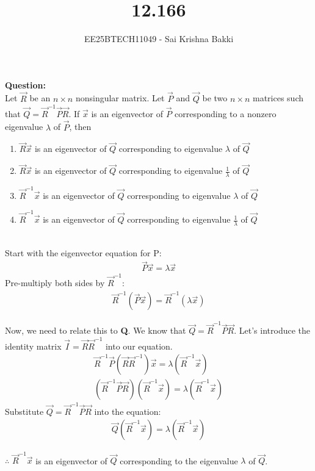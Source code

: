\documentclass[journal]{IEEEtran}
\begin{document}

\vspace{3cm}

\title{12.166}
\author{EE25BTECH11049 - Sai Krishna Bakki}
\maketitle
\vspace{-3em}
\textbf{Question:}\\
Let $\vec{R}$ be an $n \times n$ nonsingular matrix. Let $\vec{P}$ and $\vec{Q}$ be two $n \times n$ matrices such that $\vec{Q} = \vec{R}^{-1}\vec{P}\vec{R}$. If $\vec{x}$ is an eigenvector of $\vec{P}$ corresponding to a nonzero eigenvalue $\lambda$ of $\vec{P}$, then
\begin{enumerate}[label=\alph*)]
    \item $\vec{R}\vec{x}$ is an eigenvector of $\vec{Q}$ corresponding to eigenvalue $\lambda$ of $\vec{Q}$
    \item $\vec{R}\vec{x}$ is an eigenvector of $\vec{Q}$ corresponding to eigenvalue $\frac{1}{\lambda}$ of $\vec{Q}$
    \item $\vec{R}^{-1}\vec{x}$ is an eigenvector of $\vec{Q}$ corresponding to eigenvalue $\lambda$ of $\vec{Q}$
    \item $\vec{R}^{-1}\vec{x}$ is an eigenvector of $\vec{Q}$ corresponding to eigenvalue $\frac{1}{\lambda}$ of $\vec{Q}$
\end{enumerate}


\solution\\
 Start with the eigenvector equation for P:
    \begin{align}
    \vec{P}\vec{x} = \lambda \vec{x}
\end{align}
Pre-multiply both sides by $\vec{R}^{-1}$:
    \begin{align} \vec{R}^{-1}(\vec{P}\vec{x}) = \vec{R}^{-1}(\lambda \vec{x}) 
    \end{align}


Now, we need to relate this to \textbf{Q}. We know that $\vec{Q} = \vec{R}^{-1}\vec{P}\vec{R}$. Let's introduce the identity matrix $\vec{I} = \vec{R}\vec{R}^{-1}$ into our equation.
    \begin{align} \vec{R}^{-1}\vec{P}(\vec{R}\vec{R}^{-1})\vec{x} = \lambda(\vec{R}^{-1}\vec{x}) \\ (\vec{R}^{-1}\vec{P}\vec{R})(\vec{R}^{-1}\vec{x}) = \lambda(\vec{R}^{-1}\vec{x}) 
\end{align}
Substitute $\vec{Q} = \vec{R}^{-1}\vec{P}\vec{R}$ into the equation:
    \begin{align} \vec{Q}(\vec{R}^{-1}\vec{x}) = \lambda(\vec{R}^{-1}\vec{x}) \end{align}

$\therefore$ $\vec{R}^{-1}\vec{x}$ is an eigenvector of $\vec{Q}$ corresponding to the eigenvalue $\lambda$ of $\vec{Q}$.
\end{document}
